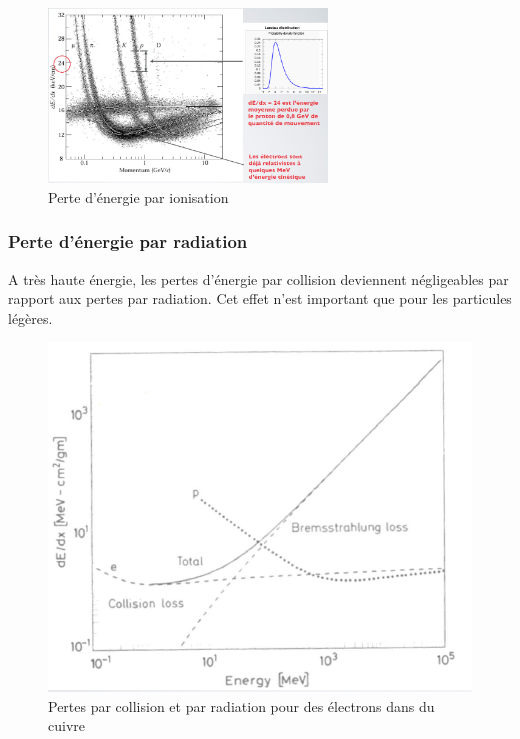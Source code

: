 \begin{figure}[H]
    \centering
    \includegraphics[width=0.66\textwidth]{Images1/perteionisation.PNG}
    \caption{Perte d'énergie par ionisation}
    \label{fig:pertes_ionisation}
\end{figure}

\subsubsection{Perte d'énergie par radiation}
A très haute énergie, les pertes d'énergie par collision deviennent négligeables par rapport aux pertes par radiation. Cet effet n'est important que pour les particules légères.

\begin{figure}[ht]
    \centering
    \includegraphics[scale=0.40]{Images1/bremstrucmachin.png}
    \caption{Pertes par collision et par radiation pour des électrons dans du cuivre}
    \label{fig:pertes_collision}
\end{figure}

